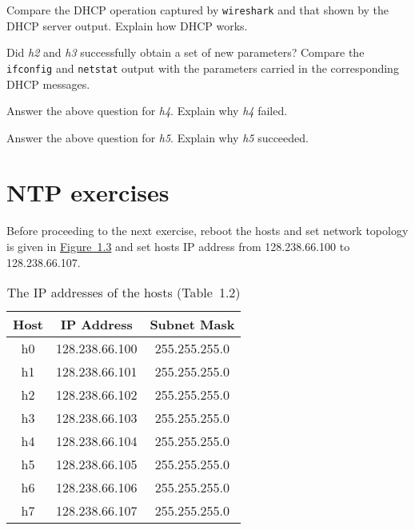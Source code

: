 \documentclass{../UTNetLab}
\begin{document}
    \begin{report}
    \item Compare the DHCP operation captured by \lstinline{wireshark} and that shown by the DHCP server output.
    Explain how DHCP works.
    
    \item Did \textit{h2} and \textit{h3} successfully obtain a set of new parameters?
    Compare the \lstinline{ifconfig} and \lstinline{netstat} output with the parameters carried in the corresponding DHCP messages.
    
    \item Answer the above question for \textit{h4}.
    Explain why \textit{h4} failed.
    
    \item Answer the above question for \textit{h5}.
    Explain why \textit{h5} succeeded.
    \end{report}

\part{NTP exercises}
    Before proceeding to the next exercise, reboot the hosts and set network topology is given in \hyperref[fig:1.3]{Figure~1.3} and set hosts IP address from 128.238.66.100 to 128.238.66.107.
    \begin{center}
        \begin{minipage}{0.48\textwidth}
            \begin{flushleft}
                \begin{table}[H]
                    \caption{The IP addresses of the hosts (Table~1.2)}
                    \centering
                    \begin{tabular}{ c c c }
                        \hline \hline
                        Host & IP Address & Subnet Mask \\
                        \hline 
                        h0 & 128.238.66.100 & 255.255.255.0 \\
                        h1 & 128.238.66.101 & 255.255.255.0 \\
                        h2 & 128.238.66.102 & 255.255.255.0 \\
                        h3 & 128.238.66.103 & 255.255.255.0 \\
                        h4 & 128.238.66.104 & 255.255.255.0 \\
                        h5 & 128.238.66.105 & 255.255.255.0 \\
                        h6 & 128.238.66.106 & 255.255.255.0 \\
                        h7 & 128.238.66.107 & 255.255.255.0 \\
                        \hline \hline
                        \end{tabular}
                \end{table}
            \end{flushleft}
        \end{minipage}
    \end{center}
\end{document}
